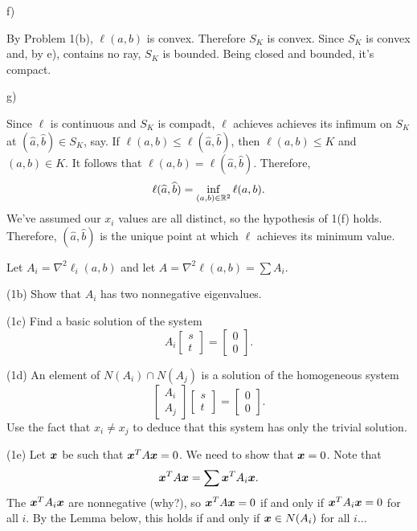\documentclass[12pt]{amsart}
\begin{document}
        f)

        By Problem 1(b), $\ell(a, b)$ is convex. Therefore $S_K$ is convex.
        Since $S_K$ is convex and, by e), contains no ray, $S_K$ is bounded.
        Being closed and bounded, it's compact.

        g)

        Since $\ell$ is continuous and $S_K$ is compadt, $\ell$ achieves
        achieves its infimum on $S_K$ at $(\hat a, \hat b)\in S_K$, say.
        If $\ell(a,b)\leq \ell(\hat a, \hat b)$,
        then $\ell(a, b)\leq K$ and $(a, b)\in K$. It follows that
        $\ell(a, b)=\ell(\hat a, \hat b)$. Therefore,
        \[
            \ell(\widehat a, \widehat b) = \inf_{(a,b)\in\mathbb{R}^2}\ell(a, b).
        \]
        We've assumed our $x_i$ values are all distinct,
        so the hypothesis of 1(f) holds.
        Therefore, $(\hat a, \hat b)$ is the unique point at which
        $\ell$ achieves its minimum value.


        Let $A_i=\nabla^2\ell_i(a, b)$ and let $A=\nabla^2\ell(a, b)=\sum A_i$.

        (1b) Show that $A_i$ has two nonnegative eigenvalues.

        (1c) Find a basic solution of the system
        \[
            A_i\begin{bmatrix}
                s\\t
            \end{bmatrix}=\begin{bmatrix}
                0\\0
            \end{bmatrix}.
        \]

        (1d) An element of $N(A_i)\cap N(A_j)$ is a solution of the homogeneous system
        \[
            \begin{bmatrix}
                A_i\\A_j
            \end{bmatrix}\begin{bmatrix}
                s\\t
            \end{bmatrix}=\begin{bmatrix}
                0\\0
            \end{bmatrix}.
        \]
        Use the fact that $x_i\neq x_j$ to deduce that this system has only the trivial solution.

        (1e) Let $\boldsymbol{x}$ be such that $\boldsymbol{x}^TA\boldsymbol{x}=0$.
        We need to show that $\boldsymbol{x}=0$. Note that
        \[
            \boldsymbol{x}^T A\boldsymbol{x} = \sum\boldsymbol{x}^TA_i\boldsymbol{x}.
        \]
        The $\boldsymbol{x}^TA_i\boldsymbol{x}$ are nonnegative (why?), so $\boldsymbol{x}^TA\boldsymbol{x}=0$ if and only if $\boldsymbol{x}^T A_i\boldsymbol{x}=0$ for all $i$.
        By the Lemma below, this holds if and only if $\boldsymbol{x}\in N(A_i)$ for all $i$...
\end{document}
